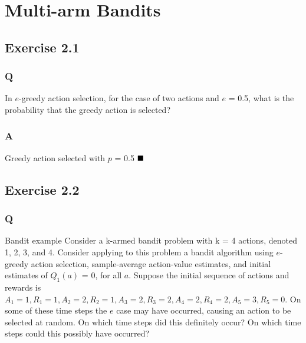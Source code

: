 \section{Multi-arm Bandits}
\subsection{Exercise 2.1}
\subsubsection*{Q}
In \(e\)-greedy action selection, for the case of two actions and \(e\) = 0.5, what is the probability that the greedy action is selected?

\subsubsection*{A}
Greedy action selected with \(p\) = 0.5
$
\hfill \blacksquare
$

\subsection{Exercise 2.2}
\subsubsection*{Q}
Bandit example Consider a k-armed bandit problem with k = 4 actions, denoted 1, 2, 3, and 4. Consider applying to this problem a bandit algorithm using \(e\)-greedy action selection, sample-average action-value estimates, and initial estimates of \(Q_1(a)\) = 0, for all \(a\). Suppose the initial sequence of actions and rewards is $A_1 = 1, R_1 = 1, A_2 = 2, R_2 = 1, A_3 = 2, R_3 = 2, A_4 = 2, R_4 = 2, A_5 = 3, R_5 = 0$. On some of these time steps the \(e\) case may have occurred, causing an action to be selected at random. On which time steps did this definitely occur? On which time steps could this possibly have occurred?

